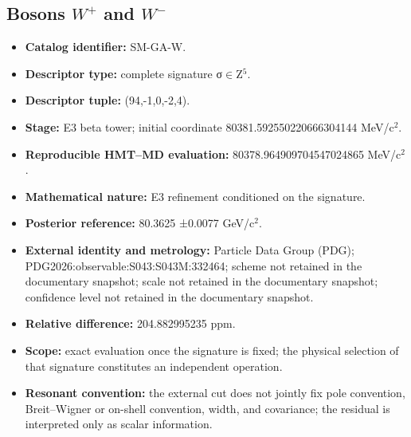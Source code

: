 \subsection{Bosons \texorpdfstring{\(W^{+}\)}{W+} and \texorpdfstring{\(W^{-}\)}{W−}}
\begin{itemize}
\item \textbf{Catalog identifier:} SM-GA-W.
\item \textbf{Descriptor type:} complete signature σ\(\in\)Z\({}^{5}\).
\item \textbf{Descriptor tuple:} (94,-1,0,-2,4).
\item \textbf{Stage:} E3 beta tower; initial coordinate 80381.592550\allowbreak{}220666\allowbreak{}304144 MeV/c\({}^{2}\).
\item \textbf{Reproducible HMT--MD evaluation:} 80378.964909\allowbreak{}704547\allowbreak{}024865 MeV/c\({}^{2}\).
\item \textbf{Mathematical nature:} E3 refinement conditioned on the signature.
\item \textbf{Posterior reference:} 80.3625 ±\allowbreak{}0.0077 GeV/c\({}^{2}\).
\item \textbf{External identity and metrology:} Particle Data Group (PDG); PDG2026:\allowbreak{}observable:\allowbreak{}S043:\allowbreak{}S043M:\allowbreak{}332464; scheme not retained in the documentary snapshot; scale not retained in the documentary snapshot; confidence level not retained in the documentary snapshot.
\item \textbf{Relative difference:} 204.882995\allowbreak{}235 ppm.
\item \textbf{Scope:} exact evaluation once the signature is fixed; the physical selection of that signature constitutes an independent operation.
\item \textbf{Resonant convention:} the external cut does not jointly fix pole convention, Breit--Wigner or on-shell convention, width, and covariance; the residual is interpreted only as scalar information.
\end{itemize}
